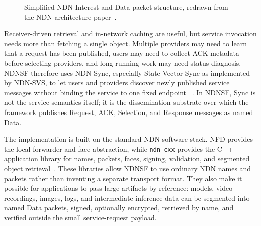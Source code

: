 \begin{figure}[H]
\centering
{}
\caption{Simplified NDN Interest and Data packet structure, redrawn from the NDN architecture paper~\cite{ndn}.}
\label{fig:ndn-packets}
\end{figure}

Receiver-driven retrieval and in-network caching are useful, but service
invocation needs more than fetching a single object. Multiple providers may
need to learn that a request has been published, users may need to collect ACK
metadata before selecting providers, and long-running work may need status
diagnosis. NDNSF therefore uses NDN Sync, especially State Vector Sync as
implemented by NDN-SVS, to let users and providers discover newly published
service messages without binding the service to one fixed endpoint
~\cite{li2018brief,moll2022sok,ndnsvs-github}. In NDNSF, Sync is not the
service semantics itself; it is the dissemination substrate over which the
framework publishes Request, ACK, Selection, and Response messages as named
Data.

The implementation is built on the standard NDN software stack. NFD provides
the local forwarder and face abstraction, while \texttt{ndn-cxx} provides the
C++ application library for names, packets, faces, signing, validation, and
segmented object retrieval~\cite{ndn-cxx}. These libraries allow NDNSF to use
ordinary NDN names and packets rather than inventing a separate transport
format. They also make it possible for applications to pass large artifacts by
reference: models, video recordings, images, logs, and intermediate inference
data can be segmented into named Data packets, signed, optionally encrypted,
retrieved by name, and verified outside the small service-request payload.


